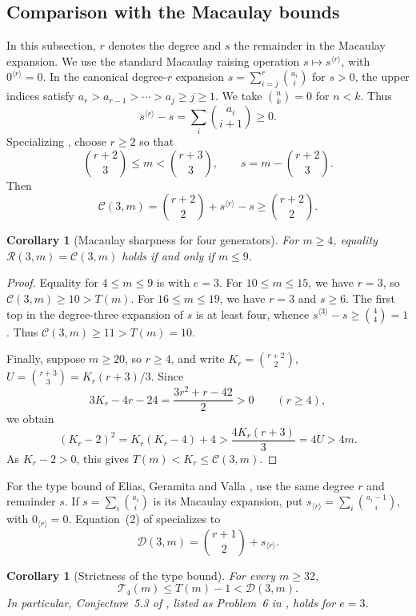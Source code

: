 \documentclass[11pt]{article}
\newtheorem{corollary}[theorem]{Corollary}
\theoremstyle{definition}
\theoremstyle{remark}
\theoremstyle{plain}
\begin{document}
\subsection{Comparison with the Macaulay bounds}\label{sec:macaulay}

In this subsection, $r$ denotes the degree and $s$ the remainder in the Macaulay expansion.
We use the standard Macaulay raising operation \(s\mapsto s^{\langle r\rangle}\),
with \(0^{\langle r\rangle}=0\). In the canonical degree-\(r\) expansion
\(s=\sum_{i=j}^r\binom{a_i}{i}\) for \(s>0\), the upper indices satisfy
\(a_r>a_{r-1}>\cdots>a_j\ge j\ge1\). We take \(\binom nk=0\) for \(n<k\).
Thus
\[
s^{\langle r\rangle}-s=\sum_i\binom{a_i}{i+1}\ge0.
\]
Specializing \cite[equation~(1)]{MS25}, choose \(r\ge2\) so that
\[
\binom{r+2}{3}\le m<\binom{r+3}{3},
\qquad s=m-\binom{r+2}{3}.
\]
Then
\[
\mathcal C(3,m)=\binom{r+2}{2}+s^{\langle r\rangle}-s
\ge\binom{r+2}{2}.
\]

\medskip
\begin{corollary}[Macaulay sharpness for four generators]\label{cor:macaulay}
For \(m\ge4\), equality \(\mathcal R(3,m)=\mathcal C(3,m)\) holds
if and only if \(m\le9\).\end{corollary}

\begin{proof}
Equality for \(4\le m\le9\) is \cite[Theorem~3.3]{MS25} with
\(e=3\). For \(10\le m\le15\), we have \(r=3\), so
\(\mathcal C(3,m)\ge10>T(m)\). For \(16\le m\le19\), we have
\(r=3\) and \(s\ge6\). The first top in the degree-three expansion
of \(s\) is at least four, whence
\(s^{\langle3\rangle}-s\ge\binom44=1\). Thus
\(\mathcal C(3,m)\ge11>T(m)=10\).

Finally, suppose \(m\ge20\), so \(r\ge4\), and write
\(K_r=\binom{r+2}{2}\), \(U=\binom{r+3}{3}=K_r(r+3)/3\).
Since
\[
3K_r-4r-24=\frac{3r^2+r-42}{2}>0 \qquad(r\ge4),
\]
we obtain
\[
(K_r-2)^2=K_r(K_r-4)+4>
\frac{4K_r(r+3)}3=4U>4m.
\]
As \(K_r-2>0\), this gives \(T(m)<K_r\le\mathcal C(3,m)\).
\end{proof}

For the type bound of Elias, Geramita and Valla \cite{EGV94}, use the same
degree $r$ and remainder $s$. If $s=\sum_i\binom{a_i}{i}$ is its Macaulay
expansion, put $s_{\langle r\rangle}=\sum_i\binom{a_i-1}{i}$, with
$0_{\langle r\rangle}=0$. Equation~(2) of \cite{MS25} specializes to
\[
\mathcal D(3,m)=\binom{r+1}{2}+s_{\langle r\rangle}.
\]

\begin{corollary}[Strictness of the type bound]\label{cor:type-strict}
For every $m\ge32$,
\[
\mathcal T_4(m)\le T(m)-1<\mathcal D(3,m).
\]
In particular, Conjecture~5.3 of \cite{MS25}, listed as Problem~6 in
\cite{MSSurvey25}, holds for $e=3$.
\end{corollary}
\end{document}
